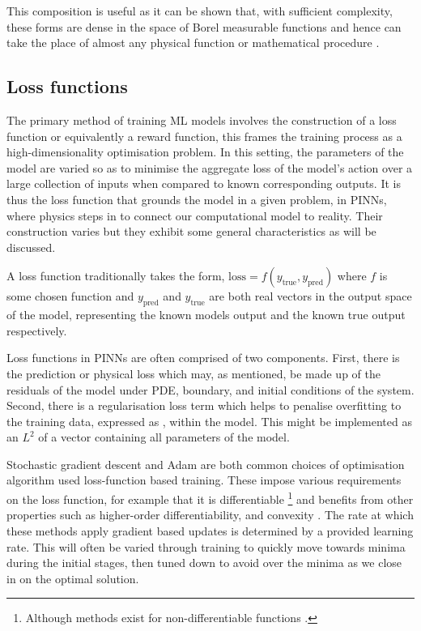 This composition is useful as it can be shown that, with sufficient complexity, these forms are dense in the space of Borel measurable functions and hence can take the place of almost any physical function or mathematical procedure \cite{hornikMultilayerFeedforwardNetworks1989}.

\subsection{Loss functions}
\label{sec:intro-lf}

The primary method of training ML models involves the construction of a loss function or equivalently a reward function, this frames the training process as a high-dimensionality optimisation problem. In this setting, the parameters of the model are varied so as to minimise the aggregate loss of the model's action over a large collection of inputs when compared to known corresponding outputs. It is thus the loss function that grounds the model in a given problem, in PINNs, where physics steps in to connect our computational model to reality. Their construction varies but they exhibit some general characteristics as will be discussed.

A loss function traditionally takes the form, $\mathrm{loss} = f(y_{\text{true}}, y_{\text{pred}})$ where $f$ is some chosen function and $y_{\text{pred}}$ and $y_{\text{true}}$ are both real vectors in the output space of the model, representing the known models output and the known true output respectively.

Loss functions in PINNs are often comprised of two components. First, there is the prediction or physical loss which may, as mentioned, be made up of the residuals of the model under PDE, boundary, and initial conditions of the system. Second, there is a regularisation loss term which helps to penalise overfitting to the training data, expressed as , within the model. This might be implemented as an $L^2$ of a vector containing all parameters of the model.

Stochastic gradient descent and Adam \cite{kingmaAdamMethodStochastic2017} are both common choices of optimisation algorithm used loss-function based training. These impose various requirements on the loss function, for example that it is differentiable \footnote{Although methods exist for non-differentiable functions \cite{daubechiesIterativeThresholdingAlgorithm2003}.} and benefits from other properties such as higher-order differentiability, and convexity \cite{sraOptimizationMachineLearning2012}. The rate at which these methods apply gradient based updates is determined by a provided learning rate. This will often be varied through training to quickly move towards minima during the initial stages, then tuned down to avoid  over the minima as we close in on the optimal solution.

